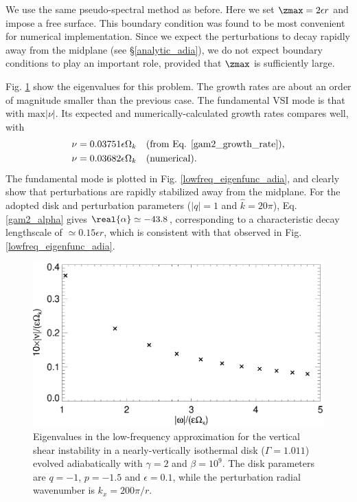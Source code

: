 We use the same pseudo-spectral method as before. Here we set
$\zmax = 2\epsilon r$ and impose a free surface. This boundary
condition was found to be most convenient for numerical
implementation. Since we expect the perturbations to decay rapidly
away from the midplane (see \S\ref{analytic_adia}), we do not expect 
boundary conditions to play an important role, provided that $\zmax$ is
sufficiently large. 

Fig. \ref{lowfreq_eigen_adia} show the eigenvalues for this
problem. The growth rates are about an order of magnitude smaller than
the previous case. The fundamental VSI mode is that with
$\mathrm{max}|\nu|$. Its expected and numerically-calculated growth
rates compares well, with 
\begin{align*}
  \nu = 0.03751 \epsilon \Omega_k &\quad \text{(from
    Eq. \ref{gam2_growth_rate})},\\
  \nu = 0.03682 \epsilon \Omega_k &\quad \text{(numerical)}.
\end{align*}
The fundamental mode is plotted in Fig. \ref{lowfreq_eigenfunc_adia},
and clearly show that perturbations are rapidly stabilized away from
the midplane. For the adopted disk and perturbation parameters 
($|q|=1$ and $\hat{k} = 20\pi$), Eq. \ref{gam2_alpha} gives $\real{\alpha}\simeq - 43.8$,
corresponding to a characteristic decay lengthscale of $\simeq
0.15\epsilon r$, which is consistent with that observed in 
Fig. \ref{lowfreq_eigenfunc_adia}. 

\begin{figure}
  \includegraphics[width=\linewidth]{figures/eigenvalues_adia}
  \caption{Eigenvalues in the low-frequency approximation for the
    vertical shear instability in a nearly-vertically isothermal disk
    ($\Gamma=1.011$) evolved adiabatically with $\gamma=2$ and
    $\beta=10^9$. The disk
    parameters are $q=-1$, 
    $p=-1.5$ and $\epsilon=0.1$, while the perturbation radial
    wavenumber is $k_x=200\pi/r$. \label{lowfreq_eigen_adia}
  }
\end{figure}
  

